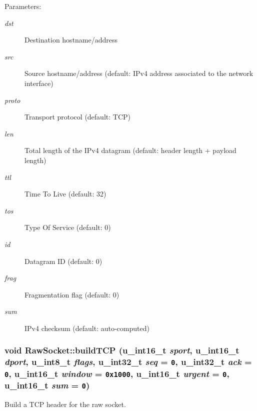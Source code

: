 \begin{Desc}
\item[Parameters:]
\begin{description}
\item[{\em dst}]Destination hostname/address \item[{\em src}]Source hostname/address (default: IPv4 address associated to the network interface) \item[{\em proto}]Transport protocol (default: TCP) \item[{\em len}]Total length of the IPv4 datagram (default: header length + payload length) \item[{\em ttl}]Time To Live (default: 32) \item[{\em tos}]Type Of Service (default: 0) \item[{\em id}]Datagram ID (default: 0) \item[{\em frag}]Fragmentation flag (default: 0) \item[{\em sum}]IPv4 checksum (default: auto-computed) \end{description}
\end{Desc}
\hypertarget{classRawSocket_ba3cca3e8ff995d5edbf064b3af8ca05}{
\subsubsection[{buildTCP}]{\setlength{\rightskip}{0pt plus 5cm}void RawSocket::buildTCP (u\_\-int16\_\-t {\em sport}, \/  u\_\-int16\_\-t {\em dport}, \/  u\_\-int8\_\-t {\em flags}, \/  u\_\-int32\_\-t {\em seq} = {\tt 0}, \/  u\_\-int32\_\-t {\em ack} = {\tt 0}, \/  u\_\-int16\_\-t {\em window} = {\tt 0x1000}, \/  u\_\-int16\_\-t {\em urgent} = {\tt 0}, \/  u\_\-int16\_\-t {\em sum} = {\tt 0})}}
\label{classRawSocket_ba3cca3e8ff995d5edbf064b3af8ca05}


Build a TCP header for the raw socket. 

